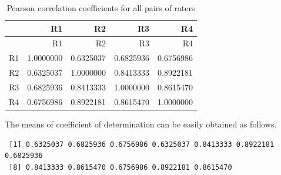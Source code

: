 \documentclass[
  letterpaper,
]{book}
\newenvironment{Shaded}{\begin{snugshade}}{\end{snugshade}}
\newcommand{\CommentTok}[1]{\textcolor[rgb]{0.37,0.37,0.37}{#1}}
\newcommand{\DecValTok}[1]{\textcolor[rgb]{0.68,0.00,0.00}{#1}}
\newcommand{\FunctionTok}[1]{\textcolor[rgb]{0.28,0.35,0.67}{#1}}
\newcommand{\NormalTok}[1]{\textcolor[rgb]{0.00,0.23,0.31}{#1}}
\newcommand{\OtherTok}[1]{\textcolor[rgb]{0.00,0.23,0.31}{#1}}
\newcommand{\SpecialCharTok}[1]{\textcolor[rgb]{0.37,0.37,0.37}{#1}}
\begin{document}
\hypertarget{tbl-correl}{}
\begin{longtable}[]{@{}lrrrr@{}}
\caption{\label{tbl-correl}Pearson correlation coefficients for all
pairs of raters}\tabularnewline
\toprule\noalign{}
& R1 & R2 & R3 & R4 \\
\midrule\noalign{}
\endfirsthead
\toprule\noalign{}
& R1 & R2 & R3 & R4 \\
\midrule\noalign{}
\endhead
\bottomrule\noalign{}
\endlastfoot
R1 & 1.0000000 & 0.6325037 & 0.6825936 & 0.6756986 \\
R2 & 0.6325037 & 1.0000000 & 0.8413333 & 0.8922181 \\
R3 & 0.6825936 & 0.8413333 & 1.0000000 & 0.8615470 \\
R4 & 0.6756986 & 0.8922181 & 0.8615470 & 1.0000000 \\
\end{longtable}

The means of coefficient of determination can be easily obtained as
follows.

\begin{Shaded}
\end{Shaded}

\begin{verbatim}
 [1] 0.6325037 0.6825936 0.6756986 0.6325037 0.8413333 0.8922181 0.6825936
 [8] 0.8413333 0.8615470 0.6756986 0.8922181 0.8615470
\end{verbatim}

\begin{Shaded}
\end{Shaded}
\end{document}
